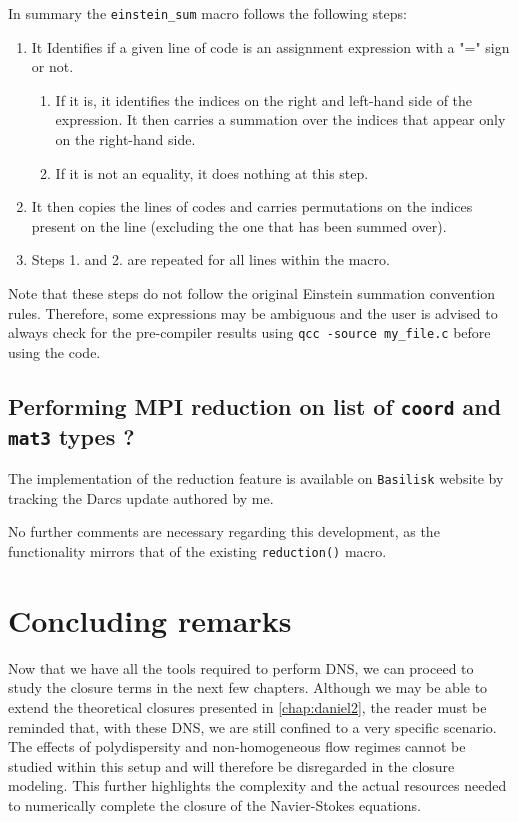 In summary the \texttt{einstein\_sum} macro follows the following steps:
\begin{enumerate}
    \item  It Identifies if a given line of code is an assignment expression with a "=" sign or not. 
    \begin{enumerate}
    \item If it is, it identifies the indices on the right and left-hand side of the expression. 
       It then carries a summation over the indices that appear only on the right-hand side. 
    \item If it is not an equality, it does nothing at this step. 
    \end{enumerate}
    \item  It then copies the lines of codes and carries permutations on the indices present on the line (excluding the one that has been summed over). 
    \item Steps 1. and 2. are repeated for all lines within the macro. 
\end{enumerate}
Note that these steps do not follow the original Einstein summation convention rules. 
Therefore, some expressions may be ambiguous and the user is advised to always check for the pre-compiler results using \texttt{qcc -source my\_file.c} before using the code.

\subsection{Performing  MPI reduction on list of \texttt{coord} and \texttt{mat3} types ?}

The implementation of the reduction feature is available on \texttt{Basilisk} website by tracking the Darcs update authored by me.

No further comments are necessary regarding this development, as the functionality mirrors that of the existing \texttt{reduction()} macro.



\section{Concluding remarks}

Now that we have all the tools required to perform DNS, we can proceed to study the closure terms in the next few chapters. Although we may be able to extend the theoretical closures presented in \ref{chap:daniel2}, the reader must be reminded that, with these DNS, we are still confined to a very specific scenario. 
The effects of polydispersity and non-homogeneous flow regimes cannot be studied within this setup and will therefore be disregarded in the closure modeling. 
This further highlights the complexity and the actual resources needed to numerically complete the closure of the Navier-Stokes equations.






